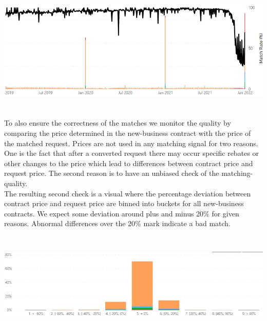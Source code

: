 \documentclass[12pt,titlepage]{article}
\begin{document}
\centerline{\includegraphics[height=6cm]{matching.png}}

To also ensure the correctness of the matches we monitor the quality by comparing the price determined in the new-business contract with the price of the matched request. Prices are not used in any matching signal for two reasons. One is the fact that after a converted request there may occur specific rebates or other changes to the price which lead to differences between contract price and request price. The second reason is to have an unbiased check of the matching-quality. \\
The resulting second check is a visual where the percentage deviation between contract price and request price are binned into buckets for all new-business contracts. We expect some deviation around plus and minus 20\% for given reasons. Abnormal differences over the 20\% mark indicate a bad match. \\

\centerline{\includegraphics[height=5cm]{quality.png}}
\end{document}
